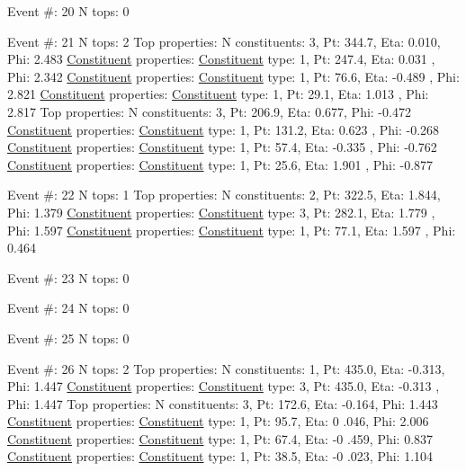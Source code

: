\begin{DoxyCode}
Event #: 20
      N tops: 0

Event #: 21
      N tops: 2
      Top properties: N constituents:   3,   Pt:  344.7,   Eta:   0.010,   Phi:   2.483
          \hyperlink{classConstituent}{Constituent} properties: \hyperlink{classConstituent}{Constituent} type:   1,   Pt:  247.4,   Eta:   0.031
      ,   Phi:   2.342
          \hyperlink{classConstituent}{Constituent} properties: \hyperlink{classConstituent}{Constituent} type:   1,   Pt:   76.6,   Eta:  -0.489
      ,   Phi:   2.821
          \hyperlink{classConstituent}{Constituent} properties: \hyperlink{classConstituent}{Constituent} type:   1,   Pt:   29.1,   Eta:   1.013
      ,   Phi:   2.817
      Top properties: N constituents:   3,   Pt:  206.9,   Eta:   0.677,   Phi:  -0.472
          \hyperlink{classConstituent}{Constituent} properties: \hyperlink{classConstituent}{Constituent} type:   1,   Pt:  131.2,   Eta:   0.623
      ,   Phi:  -0.268
          \hyperlink{classConstituent}{Constituent} properties: \hyperlink{classConstituent}{Constituent} type:   1,   Pt:   57.4,   Eta:  -0.335
      ,   Phi:  -0.762
          \hyperlink{classConstituent}{Constituent} properties: \hyperlink{classConstituent}{Constituent} type:   1,   Pt:   25.6,   Eta:   1.901
      ,   Phi:  -0.877

Event #: 22
      N tops: 1
      Top properties: N constituents:   2,   Pt:  322.5,   Eta:   1.844,   Phi:   1.379
          \hyperlink{classConstituent}{Constituent} properties: \hyperlink{classConstituent}{Constituent} type:   3,   Pt:  282.1,   Eta:   1.779
      ,   Phi:   1.597
          \hyperlink{classConstituent}{Constituent} properties: \hyperlink{classConstituent}{Constituent} type:   1,   Pt:   77.1,   Eta:   1.597
      ,   Phi:   0.464

Event #: 23
      N tops: 0

Event #: 24
      N tops: 0

Event #: 25
      N tops: 0

Event #: 26
      N tops: 2
      Top properties: N constituents:   1,   Pt:  435.0,   Eta:  -0.313,   Phi:   1.447
          \hyperlink{classConstituent}{Constituent} properties: \hyperlink{classConstituent}{Constituent} type:   3,   Pt:  435.0,   Eta:  -0.313
      ,   Phi:   1.447
          Top properties: N constituents:   3,   Pt:  172.6,   Eta:  -0.164,   Phi:   1.443
              \hyperlink{classConstituent}{Constituent} properties: \hyperlink{classConstituent}{Constituent} type:   1,   Pt:   95.7,   Eta:   0
      .046,   Phi:   2.006
              \hyperlink{classConstituent}{Constituent} properties: \hyperlink{classConstituent}{Constituent} type:   1,   Pt:   67.4,   Eta:  -0
      .459,   Phi:   0.837
              \hyperlink{classConstituent}{Constituent} properties: \hyperlink{classConstituent}{Constituent} type:   1,   Pt:   38.5,   Eta:  -0
      .023,   Phi:   1.104


\end{DoxyCode}

